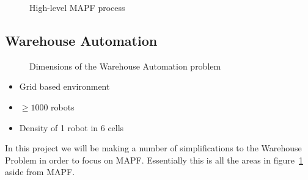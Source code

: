 \documentclass[a4paper,11pt]{article}
\begin{document}

\begin{figure}[H]
\centering
{}
\caption{High-level MAPF process}
\end{figure}

\subsection{Warehouse Automation}

\begin{figure}[H]
	\centering
	\small
	\caption{Dimensions of the Warehouse Automation problem}
	\label{wa-dimensions}
\end{figure}

\begin{itemize}
	\item Grid based environment
	\item $\ge 1000$ robots
	\item Density of 1 robot in 6 cells
\end{itemize}

In this project we will be making a number of simplifications to the Warehouse Problem in order to focus on MAPF. Essentially this is all the areas in figure~\ref{wa-dimensions} aside from MAPF.
\end{document}
